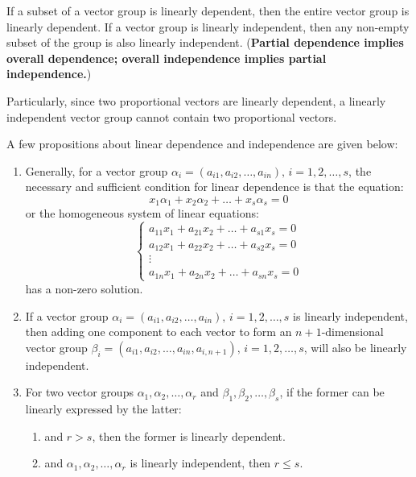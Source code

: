 \documentclass[11pt]{../../TexTemplate/elegantbook} %
\begin{document}
\begin{note}
    If a subset of a vector group is linearly dependent, then the entire vector group is linearly dependent.
    If a vector group is linearly independent, then any non-empty subset of the group is also linearly independent.
    (\textbf{Partial dependence implies overall dependence; overall independence implies partial independence.})
    
    Particularly, since two proportional vectors are linearly dependent, a linearly independent vector group cannot contain two proportional vectors.
\end{note}

A few propositions about linear dependence and independence are given below:
\begin{proposition}
\begin{enumerate}
    \item Generally, for a vector group \( \alpha_i = (a_{i1}, a_{i2}, \dots, a_{in}), \, i = 1, 2, \dots, s \), 
        the necessary and sufficient condition for linear dependence is that the equation:
        \[
        x_1 \alpha_1 + x_2 \alpha_2 + \dots + x_s \alpha_s = 0
        \]
        or the homogeneous system of linear equations:
        \[
        \begin{cases}
        a_{11}x_1 + a_{21}x_2 + \dots + a_{s1}x_s = 0 \\
        a_{12}x_1 + a_{22}x_2 + \dots + a_{s2}x_s = 0 \\
        \vdots \\
        a_{1n}x_1 + a_{2n}x_2 + \dots + a_{sn}x_s = 0
        \end{cases}
        \]
        has a non-zero solution.

    \item  If a vector group \( \alpha_i = (a_{i1}, a_{i2}, \dots, a_{in}), \, i = 1, 2, \dots, s \) 
        is linearly independent, then adding one component to each vector to form an \( n+1 \)-dimensional 
        vector group \( \beta_i = (a_{i1}, a_{i2}, \dots, a_{in}, a_{i,n+1}), \, i = 1, 2, \dots, s \), 
        will also be linearly independent.

    \item For two vector groups \( \alpha_1, \alpha_2, \dots, \alpha_r \) and \( \beta_1, \beta_2, \dots, \beta_s \),
        if the former can be linearly expressed by the latter:
        \begin{enumerate}[label=\roman*.]
            \item and \( r > s \), then the former is linearly dependent.
            \item and \( \alpha_1, \alpha_2, \dots, \alpha_r \) is linearly independent, then \( r \leqslant s \).
        \end{enumerate}


\end{enumerate}
\end{proposition}
\end{document}
